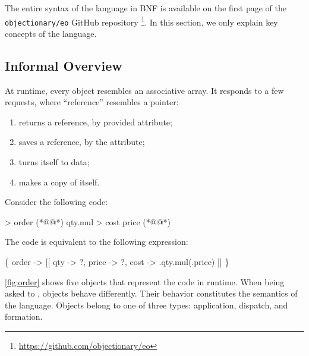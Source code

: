 


The entire syntax of the \eolang{} language in BNF is available on the first page of the \texttt{objectionary/eo} GitHub repository%
  \footnote{\url{https://github.com/objectionary/eo}}.
In this section, we only explain key concepts of the language.

\subsection{Informal Overview}

At runtime, every \eolang{} object resembles an associative array.
It responds to a few requests, where ``reference'' resembles a pointer:
\begin{enumerate}
  \item {} returns a reference, by provided attribute;
  \item {} saves a reference, by the attribute;
  \item {} turns itself to data;
  \item {} makes a copy of itself.
\end{enumerate}

Consider the following code:

\begin{ffcode}
 > order (*@\label{ln:order-start}@*)
  qty.mul > cost
    price (*@\label{ln:order-stop}@*)
\end{ffcode}

The code is equivalent to the following \phic{} expression:
\begin{phiquation*}
\Big\{ order -> [[ qty -> ?, price -> ?, cost -> \xi.qty.mul(\xi.price) ]] \Big\}
\end{phiquation*}

\cref{fig:order} shows five objects that represent the code in runtime.
When being asked to , objects behave differently.
Their behavior constitutes the semantics of the language.
Objects belong to one of three types: application, dispatch, and formation.

